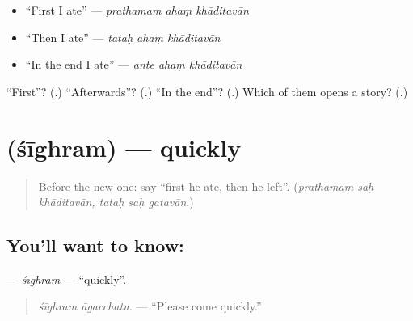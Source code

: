 \begin{itemize}
\raggedright
  \item \textquotedblleft{}First I ate\textquotedblright{} — \emph{prathamam ahaṃ khāditavān}
  \item \textquotedblleft{}Then I ate\textquotedblright{} — \emph{tataḥ ahaṃ khāditavān}
  \item \textquotedblleft{}In the end I ate\textquotedblright{} — \emph{ante ahaṃ khāditavān}
\end{itemize}

\begin{tcolorbox}[breakable,colback=teal!4,colframe=teal!35!black,title={Before you move on}]
\textquotedblleft{}First\textquotedblright{}? (\textbf{}.) \textquotedblleft{}Afterwards\textquotedblright{}? (\textbf{}.) \textquotedblleft{}In the end\textquotedblright{}? (\textbf{}.) Which of them opens a story? (\textbf{}.)
\end{tcolorbox}
\section[\texorpdfstring{\sk{शीघ्रम्} (śīghram)}{शीघ्रम् (śīghram)}]{ (śīghram) — quickly}

\label{lesson:SA-C277-sighram}



\begin{quote}
Before the new one: say \textquotedblleft{}first he ate, then he left\textquotedblright{}. (\emph{prathamaṃ saḥ khāditavān, tataḥ saḥ gatavān}.)
\end{quote}

\subsection*{You'll want to know: }
\textbf{} — \emph{śīghram} — \textquotedblleft{}quickly\textquotedblright{}.

\begin{quote}
\textbf{ }
\end{quote}

\begin{quote}
\emph{śīghram āgacchatu.} — \textquotedblleft{}Please come quickly.\textquotedblright{}
\end{quote}

\begin{quote}
\textbf{  }
\end{quote}

